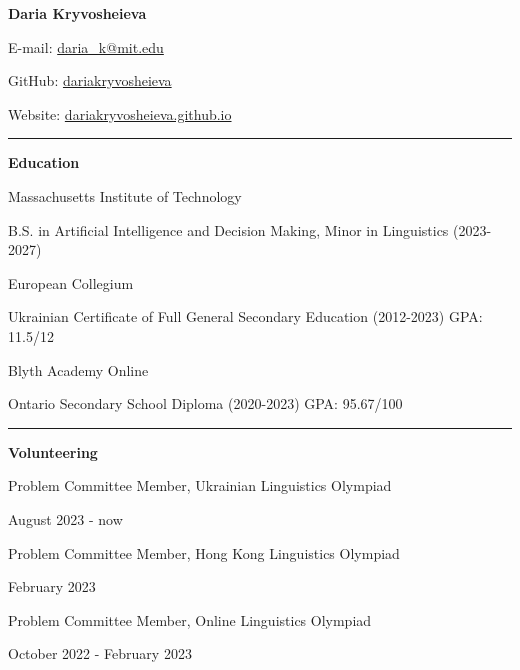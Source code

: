 \documentclass[12pt]{article}
\begin{document}
{\large\textbf{Daria Kryvosheieva}}

\vspace{8pt}

\small{E-mail: \href{mailto:daria\_k@mit.edu}{daria\_k@mit.edu}}

\small{GitHub: \href{https://github.com/dariakryvosheieva}{dariakryvosheieva}}

\small{Website: \href{https://dariakryvosheieva.github.io}{dariakryvosheieva.github.io}

\vspace{8pt}

\hrule

\vspace{16pt}

\large{\textbf{Education}}

\vspace{8pt}

\normalsize{Massachusetts Institute of Technology}

\quad \small{B.S. in Artificial Intelligence and Decision Making, Minor in Linguistics (2023-2027)}

\normalsize{European Collegium}

\quad \small{Ukrainian Certificate of Full General Secondary Education (2012-2023) GPA: 11.5/12}

\normalsize{Blyth Academy Online}

\quad \small{Ontario Secondary School Diploma (2020-2023) GPA: 95.67/100}

\vspace{8pt}

\hrule

\vspace{16pt}

\large{\textbf{Volunteering}}

\vspace{8pt}

\normalsize{Problem Committee Member, Ukrainian Linguistics Olympiad}

\quad \small{August 2023 - now}

\normalsize{Problem Committee Member, Hong Kong Linguistics Olympiad}

\quad \small{February 2023}

\normalsize{Problem Committee Member, Online Linguistics Olympiad}

\quad \small{October 2022 - February 2023}

\vspace{8pt}

}
\end{document}
